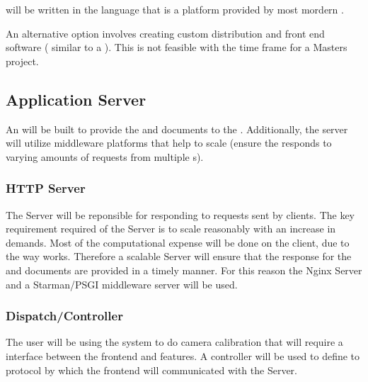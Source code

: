 \documentclass[11pt]{report}
\begin{document}
 will be written in the  language that is a platform provided by most mordern . 

An alternative option involves creating custom distribution and front end software ( similar to a  ). This is not feasible with the time frame for a Masters project. 

\subsection{Application Server}


An  will be built to provide the  and  documents to the . Additionally, the server will utilize middleware platforms that help to scale (ensure the  responds to varying amounts of requests from multiple s).

\subsubsection{HTTP Server}


The  Server will be reponsible for responding to requests sent by  clients. The key requirement required of the  Server is to scale reasonably with an increase in demands. Most of the computational expense will be done on the  client, due to the way  works. Therefore a scalable  Server will ensure that the response for the  and  documents are provided in a timely manner. For this reason the Nginx  Server and a Starman/PSGI middleware server will be used.

\subsubsection{Dispatch/Controller}


The user will be using the system to do camera calibration that will require a interface between the frontend and  features. A controller will be used to define to protocol by which the frontend will communicated with the  Server. 
\end{document}
